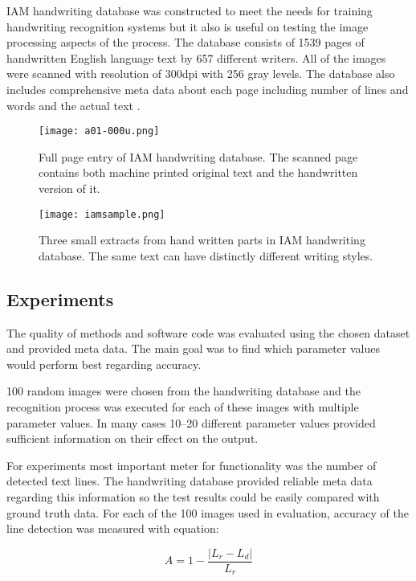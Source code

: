 \documentclass{article}
\begin{document}
    IAM handwriting database was constructed to meet the needs for training handwriting recognition systems but it also is useful on testing the image processing aspects of the process. The database consists of 1539 pages of handwritten English language text by 657 different writers. All of the images were scanned with resolution of 300dpi with 256 gray levels. The database also includes comprehensive meta data about each page including number of lines and words and the actual text \cite{IAM}.

    \begin{figure}[!ht]
      \centering
      \texttt{[image: a01-000u.png]}
      \caption{Full page entry of IAM handwriting database. The scanned page contains both machine printed original text and the handwritten version of it. \label{fig:iamsample} }
    \end{figure}

    \begin{figure}[!ht]
      \centering
      \texttt{[image: iamsample.png]}
      \caption{Three small extracts from hand written parts in IAM handwriting database. The same text can have distinctly different writing styles. \label{fig:iamsample} }
    \end{figure}

  \subsection{Experiments}
    The quality of methods and software code was evaluated using the chosen dataset and provided meta data. The main goal was to find which parameter values would perform best regarding accuracy.

    100 random images were chosen from the handwriting database and the recognition process was executed for each of these images with multiple parameter values. In many cases 10--20 different parameter values provided sufficient information on their effect on the output.

    For experiments most important meter for functionality was the number of detected text lines. The handwriting database provided reliable meta data regarding this information so the test results could be easily compared with ground truth data. For each of the 100 images used in evaluation, accuracy of the line detection was measured with equation:

    \begin{equation}
      A = 1-\frac{|L_r-L_d|}{L_r}
    \end{equation}
\end{document}
